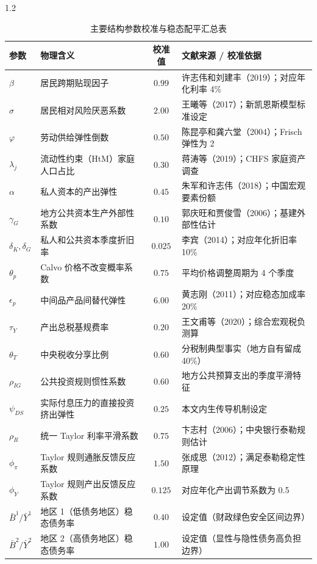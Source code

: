 \documentclass[12pt,UTF8]{ctexart}
\begin{document}
\begin{spacing}{1.2}
		\begin{table}[H]
			\centering
			\caption{主要结构参数校准与稳态配平汇总表}
			\label{tab:calibration}
			\small
			\begin{tabular}{llcl}
				\toprule
				\textbf{参数} & \textbf{物理含义} & \textbf{校准值} & \textbf{文献来源 / 校准依据} \\
				\midrule
				$\beta$ & 居民跨期贴现因子 & $0.99$ & 许志伟和刘建丰（2019）；对应年化利率 4\% \\
				$\sigma$ & 居民相对风险厌恶系数 & $2.00$ & 王曦等（2017）；新凯恩斯模型标准设定 \\
				$\varphi$ & 劳动供给弹性倒数 & $0.50$ & 陈昆亭和龚六堂（2004）；Frisch 弹性为 2 \\
				$\lambda_j$ & 流动性约束（HtM）家庭人口占比 & $0.30$ & 蒋涛等（2019）；CHFS 家庭资产调查 \\
				$\alpha$ & 私人资本的产出弹性 & $0.45$ & 朱军和许志伟（2018）；中国宏观要素份额 \\
				$\gamma_G$ & 地方公共资本生产外部性系数 & $0.10$ & 郭庆旺和贾俊雪（2006）；基建外部性估计 \\
				$\delta_K, \delta_G$ & 私人和公共资本季度折旧率 & $0.025$ & 李宾（2014）；对应年化折旧率 10\% \\
				$\theta_p$ & Calvo 价格不改变概率系数 & $0.75$ & 平均价格调整周期为 4 个季度 \\
				$\epsilon_p$ & 中间品产品间替代弹性 & $6.00$ & 黄志刚（2011）；对应稳态加成率 20\% \\
				$\tau_Y$ & 产出总税基规费率 & $0.20$ & 王文甫等（2020）；综合宏观税负测算 \\
				$\theta_T$ & 中央税收分享比例 & $0.60$ & 分税制典型事实（地方自有留成 40\%） \\
				$\rho_{IG}$ & 公共投资规则惯性系数 & $0.60$ & 地方公共预算支出的季度平滑特征 \\
				$\psi_{DS}$ & 实际付息压力的直接投资挤出弹性 & $0.25$ & 本文内生传导机制设定 \\
				$\rho_R$ & 统一 Taylor 利率平滑系数 & $0.75$ & 卞志村（2006）；中央银行泰勒规则估计 \\
				$\phi_\pi$ & Taylor 规则通胀反馈反应系数 & $1.50$ & 张成思（2012）；满足泰勒稳定性原理 \\
				$\phi_Y$ & Taylor 规则产出反馈反应系数 & $0.125$ & 对应年化产出调节系数为 0.5 \\
				$\bar{B}^1/\bar{Y}^1$ & 地区 1（低债务地区）稳态债务率 & $0.40$ & 设定值（财政绿色安全区间边界） \\
				$\bar{B}^2/\bar{Y}^2$ & 地区 2（高债务地区）稳态债务率 & $1.00$ & 设定值（显性与隐性债务高负担边界） \\
				\bottomrule
			\end{tabular}
		\end{table}
		

\end{spacing}
\end{document}
